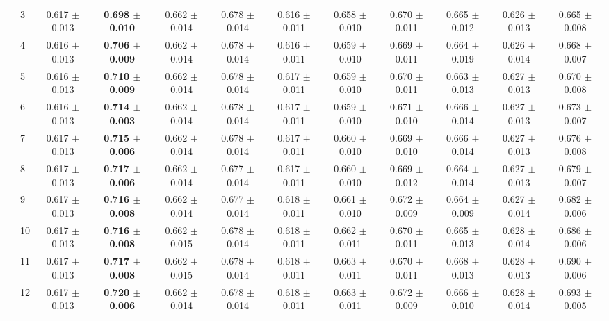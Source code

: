 \begin{table*}[t]
{\begin{tabular}{%
  ll
  @{\quad}
  c@{\hskip 4pt}c
  @{\quad\quad}
  c@{\hskip 4pt}c
  @{\quad\quad}
  c@{\hskip 4pt}c
  @{\quad\quad}
  c@{\hskip 4pt}c
  @{\quad\quad}
  c@{\hskip 4pt}c
}
        & 3 & 0.617 $\pm$ 0.013 & \textbf{0.698 $\pm$ 0.010} & 0.662 $\pm$ 0.014 & 0.678 $\pm$ 0.014 & 0.616 $\pm$ 0.011 & 0.658 $\pm$ 0.010 & 0.670 $\pm$ 0.011 & 0.665 $\pm$ 0.012 & 0.626 $\pm$ 0.013 & 0.665 $\pm$ 0.008 \\
        & 4 & 0.616 $\pm$ 0.013 & \textbf{0.706 $\pm$ 0.009} & 0.662 $\pm$ 0.014 & 0.678 $\pm$ 0.014 & 0.616 $\pm$ 0.011 & 0.659 $\pm$ 0.010 & 0.669 $\pm$ 0.011 & 0.664 $\pm$ 0.019 & 0.626 $\pm$ 0.014 & 0.668 $\pm$ 0.007 \\
        & 5 & 0.616 $\pm$ 0.013 & \textbf{0.710 $\pm$ 0.009} & 0.662 $\pm$ 0.014 & 0.678 $\pm$ 0.014 & 0.617 $\pm$ 0.011 & 0.659 $\pm$ 0.010 & 0.670 $\pm$ 0.011 & 0.663 $\pm$ 0.013 & 0.627 $\pm$ 0.013 & 0.670 $\pm$ 0.008 \\
        & 6 & 0.616 $\pm$ 0.013 & \textbf{0.714 $\pm$ 0.003} & 0.662 $\pm$ 0.014 & 0.678 $\pm$ 0.014 & 0.617 $\pm$ 0.011 & 0.659 $\pm$ 0.010 & 0.671 $\pm$ 0.010 & 0.666 $\pm$ 0.014 & 0.627 $\pm$ 0.013 & 0.673 $\pm$ 0.007 \\
        & 7 & 0.617 $\pm$ 0.013 & \textbf{0.715 $\pm$ 0.006} & 0.662 $\pm$ 0.014 & 0.678 $\pm$ 0.014 & 0.617 $\pm$ 0.011 & 0.660 $\pm$ 0.010 & 0.669 $\pm$ 0.010 & 0.666 $\pm$ 0.014 & 0.627 $\pm$ 0.013 & 0.676 $\pm$ 0.008 \\
        & 8 & 0.617 $\pm$ 0.013 & \textbf{0.717 $\pm$ 0.006} & 0.662 $\pm$ 0.014 & 0.677 $\pm$ 0.014 & 0.617 $\pm$ 0.011 & 0.660 $\pm$ 0.010 & 0.669 $\pm$ 0.012 & 0.664 $\pm$ 0.014 & 0.627 $\pm$ 0.013 & 0.679 $\pm$ 0.007 \\
        & 9 & 0.617 $\pm$ 0.013 & \textbf{0.716 $\pm$ 0.008} & 0.662 $\pm$ 0.014 & 0.677 $\pm$ 0.014 & 0.618 $\pm$ 0.011 & 0.661 $\pm$ 0.010 & 0.672 $\pm$ 0.009 & 0.664 $\pm$ 0.009 & 0.627 $\pm$ 0.014 & 0.682 $\pm$ 0.006 \\
        & 10 & 0.617 $\pm$ 0.013 & \textbf{0.716 $\pm$ 0.008} & 0.662 $\pm$ 0.015 & 0.678 $\pm$ 0.014 & 0.618 $\pm$ 0.011 & 0.662 $\pm$ 0.011 & 0.670 $\pm$ 0.011 & 0.665 $\pm$ 0.013 & 0.628 $\pm$ 0.014 & 0.686 $\pm$ 0.006 \\
        & 11 & 0.617 $\pm$ 0.013 & \textbf{0.717 $\pm$ 0.008} & 0.662 $\pm$ 0.015 & 0.678 $\pm$ 0.014 & 0.618 $\pm$ 0.011 & 0.663 $\pm$ 0.011 & 0.670 $\pm$ 0.011 & 0.668 $\pm$ 0.013 & 0.628 $\pm$ 0.013 & 0.690 $\pm$ 0.006 \\
        & 12 & 0.617 $\pm$ 0.013 & \textbf{0.720 $\pm$ 0.006} & 0.662 $\pm$ 0.014 & 0.678 $\pm$ 0.014 & 0.618 $\pm$ 0.011 & 0.663 $\pm$ 0.011 & 0.672 $\pm$ 0.009 & 0.666 $\pm$ 0.010 & 0.628 $\pm$ 0.014 & 0.693 $\pm$ 0.005 \\

\end{tabular}}
\end{table*}
